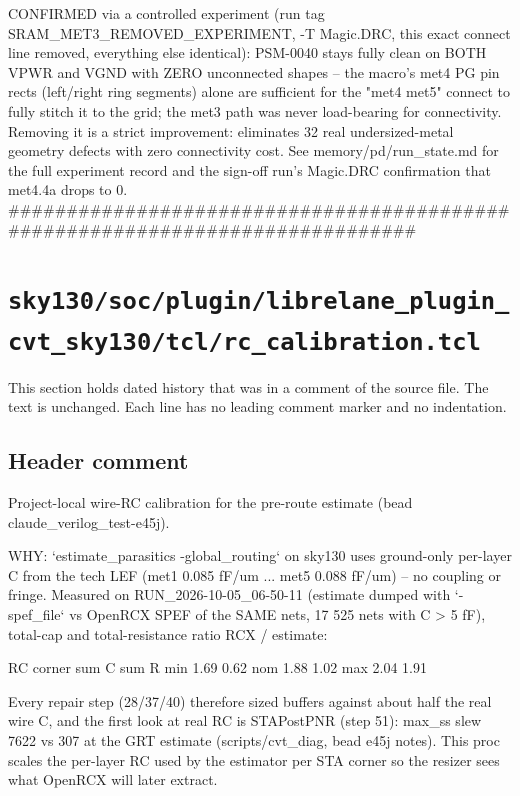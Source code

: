 \begin{record}
\begin{textblock}
CONFIRMED via a controlled experiment (run tag
SRAM_MET3_REMOVED_EXPERIMENT, -T Magic.DRC, this exact connect line
removed, everything else identical): PSM-0040 stays fully clean on
BOTH VPWR and VGND with ZERO unconnected shapes -- the macro's met4 PG
pin rects (left/right ring segments) alone are sufficient for the
"met4 met5" connect to fully stitch it to the grid; the met3 path was
never load-bearing for connectivity. Removing it is a strict
improvement: eliminates 32 real undersized-metal geometry defects with
zero connectivity cost. See memory/pd/run_state.md for the full
experiment record and the sign-off run's Magic.DRC confirmation that
met4.4a drops to 0.
##############################################################################
\end{textblock}

\end{record}

\section{\texttt{sky130/soc/plugin/librelane\_plugin\_cvt\_sky130/tcl/rc\_calibration.tcl}}\label{cr:pd:sky130-soc-plugin-librelane-cvt-tcl-rc-calibration}

This section holds dated history that was in a comment of the source file. The text is unchanged. Each line has no leading comment marker and no indentation.

\begin{record}

\subsection*{Header comment}

\begin{textblock}
Project-local wire-RC calibration for the pre-route estimate (bead claude_verilog_test-e45j).

WHY: `estimate_parasitics -global_routing` on sky130 uses ground-only per-layer C from the tech
LEF (met1 0.085 fF/um ... met5 0.088 fF/um) -- no coupling or fringe. Measured on
RUN_2026-10-05_06-50-11 (estimate dumped with `-spef_file` vs OpenRCX SPEF of the SAME nets,
17 525 nets with C > 5 fF), total-cap and total-resistance ratio RCX / estimate:

    RC corner   sum C      sum R
    min         1.69       0.62
    nom         1.88       1.02
    max         2.04       1.91

Every repair step (28/37/40) therefore sized buffers against about half the real wire C, and the
first look at real RC is STAPostPNR (step 51): max_ss slew 7622 vs 307 at the GRT estimate
(scripts/cvt_diag, bead e45j notes). This proc scales the per-layer RC used by the estimator
per STA corner so the resizer sees what OpenRCX will later extract.

\end{textblock}

\end{record}

